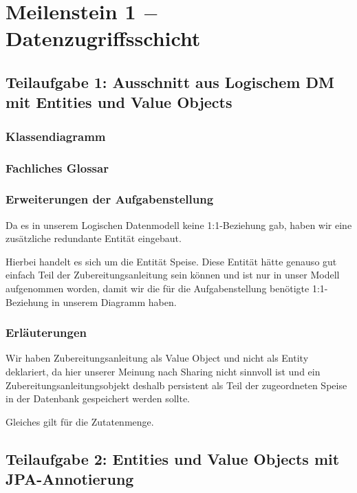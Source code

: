 \section{Meilenstein 1 $-$ Datenzugriffsschicht}

\subsection{Teilaufgabe 1: Ausschnitt aus Logischem DM mit Entities und Value Objects}

\subsubsection{Klassendiagramm}


\subsubsection{Fachliches Glossar}


\subsubsection{Erweiterungen der Aufgabenstellung}

Da es in unserem Logischen Datenmodell keine 1:1-Beziehung gab,
haben wir eine zus\"atzliche redundante Entit\"at eingebaut.

Hierbei handelt es sich um die Entit\"at Speise. Diese Entit\"at
h\"atte genauso gut einfach Teil der Zubereitungsanleitung sein
k\"onnen und ist nur in unser Modell aufgenommen worden, damit
wir die f\"ur die Aufgabenstellung ben\"otigte 1:1-Beziehung in
unserem Diagramm haben.

\subsubsection{Erl\"auterungen}

Wir haben Zubereitungsanleitung als Value Object und nicht als
Entity deklariert, da hier unserer Meinung nach Sharing nicht
sinnvoll ist und ein Zubereitungsanleitungsobjekt deshalb
persistent als Teil der zugeordneten Speise in der Datenbank
gespeichert werden sollte.

Gleiches gilt f\"ur die Zutatenmenge.


\newpage

\subsection{Teilaufgabe 2: Entities und Value Objects mit JPA-Annotierung}

